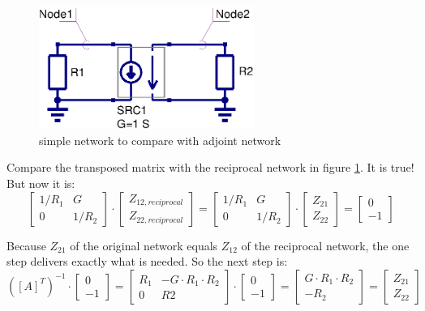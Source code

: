 \begin{figure}[ht]
\begin{center}
\includegraphics[width=7cm]{MNAnoise2}
\end{center}
\caption{simple network to compare with adjoint network}
\label{fig:mna_noise2}
\end{figure}
\FloatBarrier

Compare the transposed matrix with the reciprocal network in figure
\ref{fig:mna_noise2}.  It is true!  But now it is:
\begin{equation}
\begin{bmatrix}
1/R_1 & G\\ 0 & 1/R_2
\end{bmatrix}
\cdot
\begin{bmatrix}
Z_{12,reciprocal}\\
Z_{22,reciprocal}
\end{bmatrix}
=
\begin{bmatrix}
1/R_1 & G\\
  0   & 1/R_2
\end{bmatrix}
\cdot
\begin{bmatrix}
Z_{21}\\
Z_{22}
\end{bmatrix}
=
\begin{bmatrix}
0\\
-1
\end{bmatrix}
\end{equation}

Because $Z_{21}$ of the original network equals $Z_{12}$ of the
reciprocal network, the one step delivers exactly what is needed.
So the next step is:
\begin{equation}
([A]^T)^{-1}\cdot
\begin{bmatrix}
  0\\
 -1
\end{bmatrix}
=
\begin{bmatrix}
R_1 & -G\cdot R_1\cdot R_2\\
  0 & R2
\end{bmatrix}
\cdot
\begin{bmatrix}
  0\\
 -1
\end{bmatrix}
=
\begin{bmatrix}
G\cdot R_1\cdot R_2\\
-R_2
\end{bmatrix}
=
\begin{bmatrix}
Z_{21}\\
Z_{22}
\end{bmatrix}
\end{equation}

